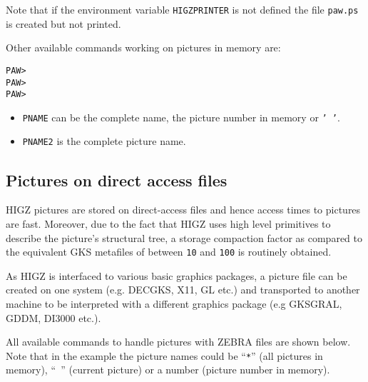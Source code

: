 Note that if the environment variable \texttt{HIGZPRINTER} is not defined the
file \texttt{paw.ps} is created but not printed.


Other available commands working on pictures in memory are:

\begin{alltt}
PAW >   
PAW >     
PAW >          
\end{alltt}

\begin{itemize}
\item \texttt{PNAME} can be the complete name, the picture number in memory or \texttt{' '}.
\item \texttt{PNAME2} is the complete picture name.
\end{itemize}

\subsection{Pictures on direct access files}

HIGZ pictures are stored on direct-access files and hence
access times to pictures are fast. Moreover, due to the fact that
HIGZ uses high level primitives to describe the picture's structural
tree, a storage compaction factor as compared to the equivalent
GKS metafiles of between \texttt{10} and \texttt{100}
is routinely obtained.

As HIGZ is interfaced to various basic graphics packages, a picture
file can be created on one system (e.g. DECGKS, X11, GL etc.) and 
transported to another machine to be interpreted with a different graphics 
package (e.g GKSGRAL, GDDM, DI3000 etc.).

All available commands to handle pictures with ZEBRA files are shown below.
Note that in the example the picture names could be ``\texttt{*}'' (all
pictures in memory), ``\texttt{ }'' (current picture) or a number
(picture number in memory).

